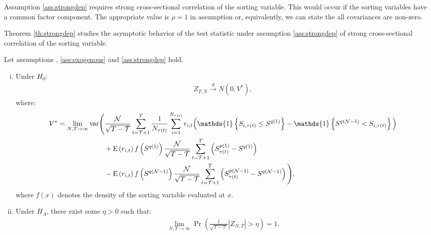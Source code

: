 \noindent
Assumption \ref{ass:strongdep} requires strong cross-sectional correlation of the sorting variable. This would occur if the sorting variables have a common factor component. The appropriate value is $\rho=1$ in assumption  or, equivalently, we can state the all covariances are non-zero. 

Theorem \ref{th:strongdep} studies the asymptotic behavior of the test statistic under assumption \ref{ass:strongdep} of strong cross-sectional correlation of the sorting variable.
\begin{theorem}
\label{th:strongdep} Let assumptions , \ref{ass:exogenous} and \ref{ass:strongdep} hold.

\begin{enumerate}[(i)]
\item Under $H_{0}$:
\begin{align*}
    Z_{T,N} \overset{d}{\rightarrow }N(0,V^{\ast }),
\end{align*}
where: 
\begin{align*}
    V^{\ast } = \lim_{N,T\rightarrow \infty } \mathrm{var} \Bigg( &\frac{\mathcal{N}}{\sqrt{T-\mathcal{T}}}\sum_{t=\mathcal{T}+1}^{T}\frac{1}{N_{\tau(t)}} \sum_{i=1}^{N_{\tau(t)}} r_{i,t} \Big(\mathds{1}\left\{ S_{i,\tau(t) } \leq S^{q(1)}\right\} - \mathds{1}\left\{ S^{q(\mathcal{N} -1)} < S_{i,\tau(t) }\right\} \Big) \\
    &+ \mathrm{E}\left( r_{i,t}\right) f \left( S^{q(1)}\right) \frac{\mathcal{N}}{\sqrt{T - \mathcal{T}}} \sum_{t=\mathcal{T}+ 1}^{T} \left( S_{\tau(t)}^{p(1)}-S^{q(1)}\right) \\
    &- \mathrm{E}\left( r_{i,t}\right) f\left( S^{q(\mathcal{N}-1)}\right) \frac{\mathcal{N}}{\sqrt{T - \mathcal{T}}}\sum_{t=\mathcal{T}+ 1}^{T} \left( S_{\tau(t)}^{p(\mathcal{N}-1)} - S^{q(\mathcal{N}-1)} \right) \Bigg), \notag
\end{align*}
where $f\left( x \right) $ denotes the density of the sorting variable evaluated at $x$.

\item Under $H_{A}$, there exist some $\eta >0$ such that: 
\begin{align*}
    \lim_{N,T\rightarrow \infty }\Pr \left( \frac{1}{\sqrt{T - \mathcal{T}}} \left\vert Z_{N,T} \right\vert > \eta \right) =1.
\end{align*}
\end{enumerate}
\end{theorem}

